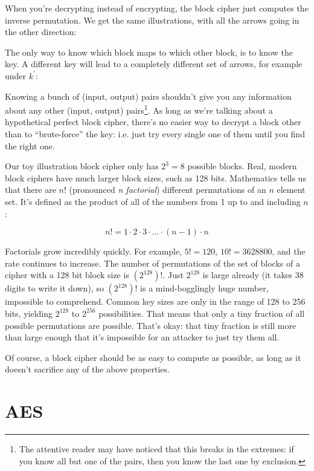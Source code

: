 \documentclass[11pt,ebook,table,dvipsnames]{memoir}
\begin{document}
When you're decrypting instead of encrypting, the block cipher just
computes the inverse permutation. We get the same illustrations, with
all the arrows going in the other direction:


The only way to know which block maps to which other block, is to know
the key. A different key will lead to a completely different set of
arrows, for example under $k^{\prime}$:


Knowing a bunch of (input, output) pairs shouldn't give you any
information about any other (input, output) pairs\footnote{The attentive
reader may have noticed that this breaks in the extremes: if you know
all but one of the pairs, then you know the last one by exclusion.}.
As long as we're talking about a hypothetical perfect block cipher,
there's no easier way to decrypt a block other than to \enquote{brute-force}
the key: i.e. just try every single one of them until you find the
right one.

Our toy illustration block cipher only has $2^3 = 8$ possible blocks.
Real, modern block ciphers have much larger block sizes, such as 128
bits. Mathematics tells us that there are $n!$ (pronounced \emph{n
factorial}) different permutations of an $n$ element set. It's defined
as the product of all of the numbers from 1 up to and including $n$:

\[
n! = 1 \cdot 2 \cdot 3 \cdot \ldots \cdot (n - 1) \cdot n
\]

Factorials grow incredibly quickly. For example, $5! = 120$, $10! =
3628800$, and the rate continues to increase. The number of
permutations of the set of blocks of a cipher with a 128 bit block
size is $(2^{128})!$. Just $2^{128}$ is large already (it takes 38
digits to write it down), so $(2^{128})!$ is a mind-bogglingly huge
number, impossible to comprehend. Common key sizes are only in the
range of 128 to 256 bits, yielding $2^{128}$ to $2^{256}$
possibilities. That means that only a tiny fraction of all possible
permutations are possible. That's okay: that tiny fraction is still
more than large enough that it's impossible for an attacker to just
try them all.

Of course, a block cipher should be as easy to compute as possible,
as long as it doesn't sacrifice any of the above properties.
\section{\label{AES}AES}
\label{sec-2-2-2}
\end{document}
